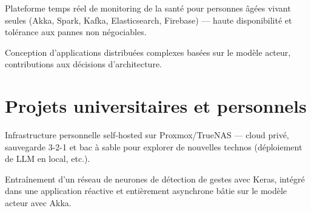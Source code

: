 \documentclass[french]{plushcv}
\begin{document}
\begin{minipage}[t]{0.74\textwidth}
\hfill
{}
\vspace{5pt}
\begin{tightemize}
\sectionsep
\item Plateforme temps réel de monitoring de la santé pour personnes âgées vivant seules (Akka, Spark, Kafka, Elasticsearch, Firebase) --- haute disponibilité et tolérance aux pannes non négociables.
\item Conception d'applications distribuées complexes basées sur le modèle acteur, contributions aux décisions d'architecture.
\end{tightemize}

\section{Projets universitaires et personnels}

\hfill
{}

Infrastructure personnelle self-hosted sur Proxmox/TrueNAS --- cloud privé, sauvegarde 3-2-1 et bac à sable pour explorer de nouvelles technos (déploiement de LLM en local, etc.).
\sectionsep
\sectionsep

\hfill
{}

Entraînement d'un réseau de neurones de détection de gestes avec Keras, intégré dans une application réactive et entièrement asynchrone bâtie sur le modèle acteur avec Akka.

\end{minipage}
\hfill
\end{document}
